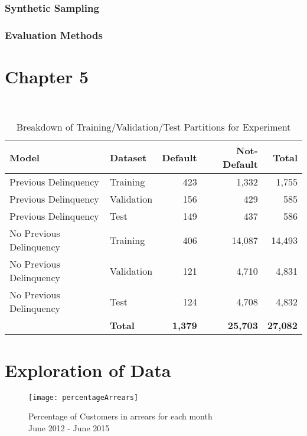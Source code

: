 \subsubsection{Synthetic Sampling }
\subsubsection{Evaluation Methods}


\section{Chapter 5}


\begin{table}[H]
	\centering\
	\resizebox{\textwidth}{!}
	{
		\begin{tabular}{l| l|r|r|r}
			\hline
			\textbf{Model} &  \textbf{Dataset} & \textbf{Default} & \textbf{Not-Default} & \textbf{Total} \\
			\hline
			Previous Delinquency          & Training       & 423 & 1,332 & 1,755 \\
			Previous Delinquency          & Validation       & 156 & 429 & 585 \\
			Previous Delinquency          & Test & 149 & 437 & 586 \\ \hline
			No Previous Delinquency          & Training & 406 & 14,087 & 14,493 \\ 
			No Previous Delinquency          & Validation & 121 & 4,710 & 4,831 \\
			No Previous Delinquency          & Test & 124 & 4,708 & 4,832 \\
			\hline
			&      	\textbf{Total }     & \textbf{1,379} & \textbf{25,703} & \textbf{27,082} \\ \hline
		\end{tabular}
	}
	\caption{Breakdown of Training/Validation/Test Partitions for Experiment}
\end{table}


\section{Exploration of  Data}
\begin{figure}[H]
	\texttt{[image: percentageArrears]}
	\caption{Percentage of Customers in arrears for each month 
		\\ June 2012 - June 2015}
	\label{fig:percentageArrears}
\end{figure}

